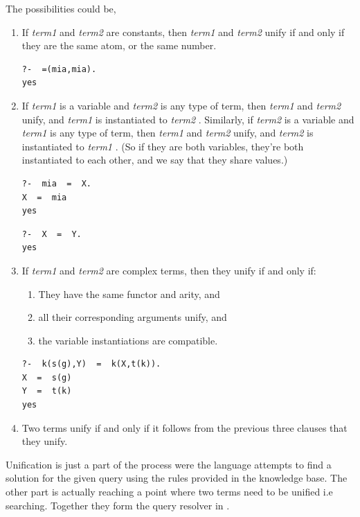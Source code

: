 \documentclass[thesis-solanki.tex]{subfiles}
\providecommand\metaSyntacticVariable[1]{\textsl{\ttfamily #1}}
\providecommand\mSV{\metaSyntacticVariable}
\begin{document}
The possibilities could be,
\begin{enumerate}
\item If \mSV{term1} and \mSV{term2} are constants, then \mSV{term1} and \mSV{term2} unify if and only if they
  are the same atom, or the same number. 
\begin{verbatim}
?-  =(mia,mia).
yes
\end{verbatim}

\item If \mSV{term1} is a variable and \mSV{term2} is any type of term, then \mSV{term1} and \mSV{term2} unify, and \mSV{term1} is instantiated to \mSV{term2} . Similarly, if 
\mSV{term2} is a variable and \mSV{term1} is any type of term, then \mSV{term1} and \mSV{term2} unify, and \mSV{term2} is instantiated to \mSV{term1} . (So if they are both 
variables, they’re both instantiated to each other, and we say that they share values.)
\begin{verbatim}
?-  mia  =  X.
X  =  mia 
yes
\end{verbatim}

\begin{verbatim}
?-  X  =  Y. 
yes
\end{verbatim}

\item If \mSV{term1} and \mSV{term2} are complex terms, then they unify if and only if:

\begin{enumerate}
\item They have the same functor and arity, and

\item all their corresponding arguments unify, and

\item the variable instantiations are compatible.
\end{enumerate}
\begin{verbatim}
?-  k(s(g),Y)  =  k(X,t(k)).
X  =  s(g) 
Y  =  t(k) 
yes
\end{verbatim}


\item Two terms unify if and only if it follows from the previous three clauses that they unify.
\end{enumerate} 

Unification is just a part of the process were the language attempts to find a solution for the given query using the rules provided in the 
knowledge base. The other part is actually reaching a point where two terms need to be unified i.e searching. Together they form the query 
resolver in .
\end{document}
